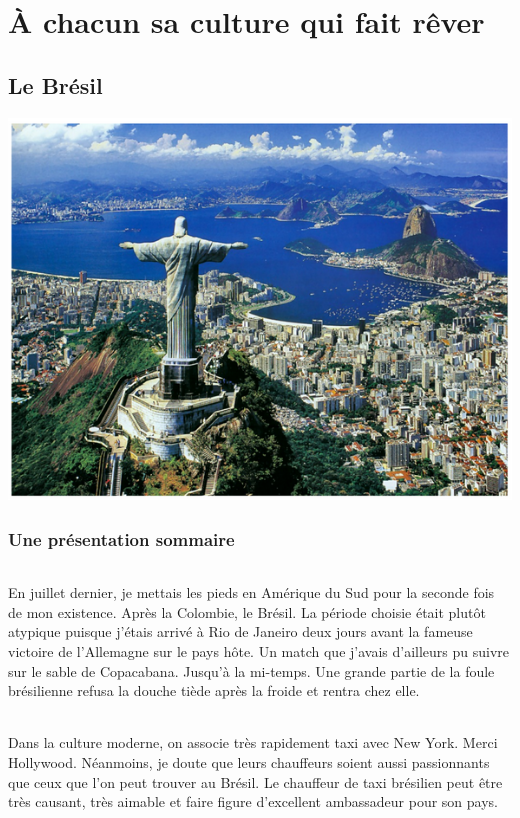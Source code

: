 \part{À chacun sa culture qui fait rêver}
\chapter{Le Brésil}

\begin{center}
\includegraphics[scale=0.5]{bresil1.png}
\end{center}

\section{Une présentation sommaire}

\paragraph{} En juillet dernier, je mettais les pieds en Amérique du Sud pour
la seconde fois de mon existence. Après la Colombie, le Brésil. La période
choisie était plutôt atypique puisque j'étais arrivé à Rio de Janeiro deux
jours avant la fameuse victoire de l'Allemagne sur le pays hôte. Un match que
j'avais d'ailleurs pu suivre sur le sable de Copacabana. Jusqu'à la mi-temps.
Une grande partie de la foule brésilienne refusa la douche tiède après la
froide et rentra chez elle.

\paragraph{} Dans la culture moderne, on associe très rapidement taxi avec New
York. Merci Hollywood. Néanmoins, je doute que leurs chauffeurs soient aussi
passionnants que ceux que l'on peut trouver au Brésil.  Le chauffeur de taxi
brésilien peut être très causant, très aimable et faire figure d'excellent
ambassadeur pour son pays.

